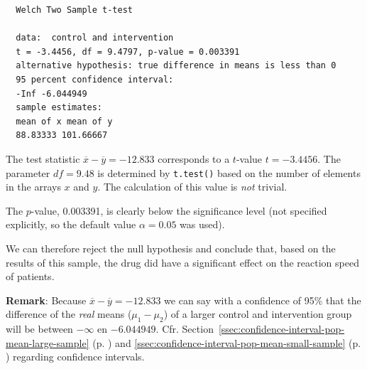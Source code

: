 \begin{example}
\begin{verbatim}
  Welch Two Sample t-test

  data:  control and intervention
  t = -3.4456, df = 9.4797, p-value = 0.003391
  alternative hypothesis: true difference in means is less than 0
  95 percent confidence interval:
  -Inf -6.044949
  sample estimates:
  mean of x mean of y 
  88.83333 101.66667 
  \end{verbatim}
  
  The test statistic $\overline{x}-\overline{y}=-12.833$ corresponds to a $t$-value $t=-3.4456$.
  The parameter $df=9.48$ is determined by \texttt{t.test()} based on the number of elements in the arrays $x$ and $y$.
  The calculation of this value is \textit{not} trivial.

  The $p$-value, 0.003391, is clearly below the significance level (not specified explicitly, so the default value $\alpha = 0.05$ was used).
  
  We can therefore reject the null hypothesis and conclude that, based on the results of this sample, the drug did have a significant effect on the reaction speed of patients.
  
  \textbf{Remark}: Because $\overline{x}-\overline{y}=-12.833$
  we can say with a confidence of 95\% that the difference of the \textit{real} means ($\mu_1-\mu_2$)
  of a larger control and intervention group will be between $-\infty$ en $-6.044949$.
  Cfr. Section~\ref{ssec:confidence-interval-pop-mean-large-sample} (p. \pageref{ssec:confidence-interval-pop-mean-large-sample})
  and \ref{ssec:confidence-interval-pop-mean-small-sample} (p. \pageref{ssec:confidence-interval-pop-mean-small-sample})
  regarding confidence intervals.
\end{example}


